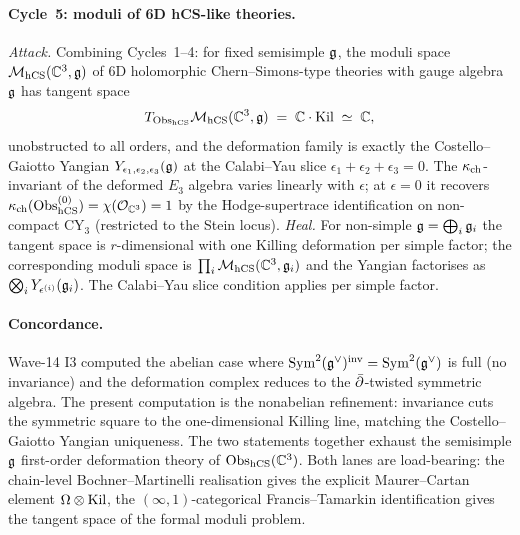 \paragraph{Cycle~5: moduli of 6D hCS-like theories.}
\emph{Attack.}  Combining Cycles~1--4: for fixed semisimple $\mathfrak{g}$, the
moduli space $\mathcal{M}_{\mathrm{hCS}}(\mathbb{C}^3,\mathfrak{g})$ of 6D holomorphic
Chern--Simons-type theories with gauge algebra $\mathfrak{g}$ has tangent space
\[
  T_{\mathrm{Obs}_{\mathrm{hCS}}}\mathcal{M}_{\mathrm{hCS}}(\mathbb{C}^3,\mathfrak{g})
  \;=\;
  \mathbb{C}\cdot\mathrm{Kil}
  \;\simeq\;
  \mathbb{C},
\]
unobstructed to all orders, and the deformation family is exactly the
Costello--Gaiotto Yangian $Y_{\epsilon_1,\epsilon_2,\epsilon_3}(\mathfrak{g})$
at the Calabi--Yau slice $\epsilon_1+\epsilon_2+\epsilon_3=0$.  The
$\kappa_{\mathrm{ch}}$-invariant of the deformed $E_3$ algebra varies linearly with
$\epsilon$; at $\epsilon=0$ it recovers $\kappa_{\mathrm{ch}}(\mathrm{Obs}_{\mathrm{hCS}}^{(0)})=
\chi(\mathcal{O}_{\mathbb{C}^3})=1$ by the Hodge-supertrace identification on
non-compact CY$_3$ (restricted to the Stein locus).
\emph{Heal.}  For non-simple $\mathfrak{g}=\bigoplus_i\mathfrak{g}_i$ the tangent space is
$r$-dimensional with one Killing deformation per simple factor; the
corresponding moduli space is $\prod_i\mathcal{M}_{\mathrm{hCS}}(\mathbb{C}^3,\mathfrak{g}_i)$
and the Yangian factorises as $\bigotimes_i Y_{\epsilon^{(i)}}(\mathfrak{g}_i)$.
The Calabi--Yau slice condition applies per simple factor.

\paragraph{Concordance.}
Wave-14 I3 computed the abelian case where $\mathrm{Sym}^2(\mathfrak{g}^\vee)^{\mathrm{inv}}=
\mathrm{Sym}^2(\mathfrak{g}^\vee)$ is full (no invariance) and the deformation complex
reduces to the $\bar\partial$-twisted symmetric algebra.  The present
computation is the nonabelian refinement: invariance cuts the
symmetric square to the one-dimensional Killing line, matching the
Costello--Gaiotto Yangian uniqueness.  The two statements together
exhaust the semisimple $\mathfrak{g}$ first-order deformation theory of
$\mathrm{Obs}_{\mathrm{hCS}}(\mathbb{C}^3)$.  Both lanes are load-bearing: the chain-level
Bochner--Martinelli realisation gives the explicit Maurer--Cartan
element $\Omega\otimes\mathrm{Kil}$, the $(\infty,1)$-categorical
Francis--Tamarkin identification gives the tangent space of the
formal moduli problem.
